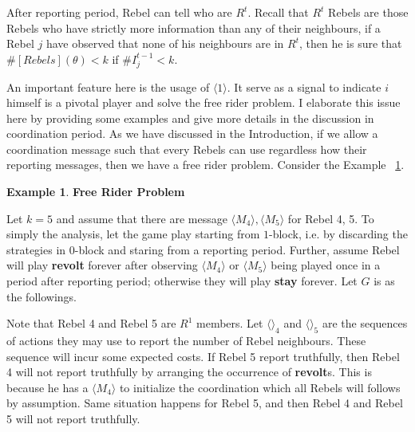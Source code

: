 \documentclass[12pt,letter]{article}
\theoremstyle{definition}
\newtheorem{example}{Example}[section]
\theoremstyle{remark}
\theoremstyle{claim}
\begin{document}
After reporting period, Rebel can tell who are $R^t$. Recall that $R^t$ Rebels are those Rebels who have strictly more information than any of their neighbours, if a Rebel $j$ have observed that none of his neighbours are in $R^t$, then he is sure that $\#[Rebels](\theta)< k$ if $\#I^{t-1}_j<k$. 

An important feature here is the usage of $\langle 1 \rangle$. It serve as a signal to indicate $i$ himself is a pivotal player and solve the free rider problem. I elaborate this issue here by providing some examples and give more details in the discussion in coordination period. As we have discussed in the Introduction, if we allow a coordination message such that every Rebels can use regardless how their reporting messages, then we have a free rider problem. Consider the Example ~\ref{ex_free_rider_tree}.

\begin{example} \label{ex_free_rider_tree}\textbf{Free Rider Problem}

Let $k=5$ and assume that there are message $\langle M_4 \rangle,\langle M_5 \rangle$ for Rebel 4, 5. To simply the analysis, let the game play starting from $1$-block, i.e. by discarding the strategies in $0$-block and staring from a reporting period. Further, assume Rebel will play \textbf{revolt} forever after observing $\langle M_4 \rangle$ or $\langle M_5 \rangle$ being played once in a period after reporting period; otherwise they will play \textbf{stay} forever. Let $G$ is as the followings.

\begin{center}
\end{center}

Note that Rebel 4 and Rebel 5 are $R^1$ members. Let $\langle \rangle_4$ and $\langle \rangle_5$ are the sequences of actions they may use to report the number of Rebel neighbours. These sequence will incur some expected costs. If Rebel 5 report truthfully, then Rebel 4 will not report truthfully by arranging the occurrence of \textbf{revolt}s. This is because he has a $\langle M_4 \rangle$ to initialize the coordination which all Rebels will follows by assumption. Same situation happens for Rebel 5, and then Rebel 4 and Rebel 5 will not report truthfully.

\end{example}
\end{document}
